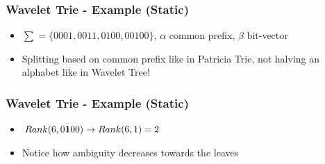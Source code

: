 \documentclass{beamer}
\begin{document}
\begin{frame}
\frametitle{Wavelet Trie - Example (Static)}
\begin{itemize}
  \item $\sum = \{0001, 0011, 0100, 00100\}$, $\alpha$ common prefix, $\beta$ bit-vector
  \item Splitting based on common prefix like in Patricia Trie, not halving an alphabet like in Wavelet Tree!
\end{itemize}
\begin{figure}[b!]
\end{figure}
\end{frame}


\begin{frame}
\frametitle{Wavelet Trie - Example (Static)}
\begin{itemize}
  \item $Rank(6, 0{\bf 1}00) \rightarrow Rank(6, 1) = 2$
  \item Notice how ambiguity decreases towards the leaves
\end{itemize}
\begin{figure}[b]
\end{figure}
\end{frame}
\end{document}
